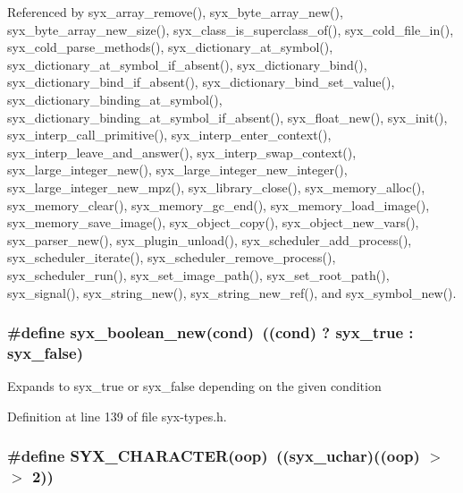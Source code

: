 Referenced by syx\_\-array\_\-remove(), syx\_\-byte\_\-array\_\-new(), syx\_\-byte\_\-array\_\-new\_\-size(), syx\_\-class\_\-is\_\-superclass\_\-of(), syx\_\-cold\_\-file\_\-in(), syx\_\-cold\_\-parse\_\-methods(), syx\_\-dictionary\_\-at\_\-symbol(), syx\_\-dictionary\_\-at\_\-symbol\_\-if\_\-absent(), syx\_\-dictionary\_\-bind(), syx\_\-dictionary\_\-bind\_\-if\_\-absent(), syx\_\-dictionary\_\-bind\_\-set\_\-value(), syx\_\-dictionary\_\-binding\_\-at\_\-symbol(), syx\_\-dictionary\_\-binding\_\-at\_\-symbol\_\-if\_\-absent(), syx\_\-float\_\-new(), syx\_\-init(), syx\_\-interp\_\-call\_\-primitive(), syx\_\-interp\_\-enter\_\-context(), syx\_\-interp\_\-leave\_\-and\_\-answer(), syx\_\-interp\_\-swap\_\-context(), syx\_\-large\_\-integer\_\-new(), syx\_\-large\_\-integer\_\-new\_\-integer(), syx\_\-large\_\-integer\_\-new\_\-mpz(), syx\_\-library\_\-close(), syx\_\-memory\_\-alloc(), syx\_\-memory\_\-clear(), syx\_\-memory\_\-gc\_\-end(), syx\_\-memory\_\-load\_\-image(), syx\_\-memory\_\-save\_\-image(), syx\_\-object\_\-copy(), syx\_\-object\_\-new\_\-vars(), syx\_\-parser\_\-new(), syx\_\-plugin\_\-unload(), syx\_\-scheduler\_\-add\_\-process(), syx\_\-scheduler\_\-iterate(), syx\_\-scheduler\_\-remove\_\-process(), syx\_\-scheduler\_\-run(), syx\_\-set\_\-image\_\-path(), syx\_\-set\_\-root\_\-path(), syx\_\-signal(), syx\_\-string\_\-new(), syx\_\-string\_\-new\_\-ref(), and syx\_\-symbol\_\-new().\hypertarget{syx-types_8h_7143a326eced154ac29a1b799ba21bb3}{
\subsubsection{\setlength{\rightskip}{0pt plus 5cm}\#define syx\_\-boolean\_\-new(cond)~((cond) ? {\bf syx\_\-true} : {\bf syx\_\-false})}}
\label{syx-types_8h_7143a326eced154ac29a1b799ba21bb3}


Expands to syx\_\-true or syx\_\-false depending on the given condition 

Definition at line 139 of file syx-types.h.\hypertarget{syx-types_8h_23b08fedbb0ef681b2d61ce88bd6dc4c}{
\subsubsection{\setlength{\rightskip}{0pt plus 5cm}\#define SYX\_\-CHARACTER(oop)~(({\bf syx\_\-uchar})((oop) $>$$>$ 2))}}
\label{syx-types_8h_23b08fedbb0ef681b2d61ce88bd6dc4c}


